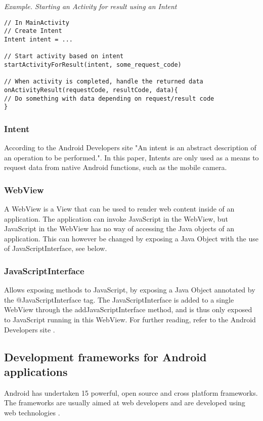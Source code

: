 \emph{Example. Starting an Activity for result using an Intent}
\begin{lstlisting}
// In MainActivity
// Create Intent
Intent intent = ...

// Start activity based on intent
startActivityForResult(intent, some_request_code)

// When activity is completed, handle the returned data
onActivityResult(requestCode, resultCode, data){
// Do something with data depending on request/result code
}
\end{lstlisting}

\subsubsection{Intent}
According to the Android Developers site \cite{intent2015} "An intent is an abstract description of an operation to be performed.". In this paper, Intents are only used as a means to request data from native Android functions, such as the mobile camera.  

\subsubsection{WebView}
A WebView \cite{webview2015} is a View \cite{view2015} that can be used to render web content inside of an application. The application can invoke JavaScript in the WebView, but JavaScript in the WebView has no way of accessing the Java objects of an application. This can however be changed by exposing a Java Object with the use of JavaScriptInterface, see below.

\subsubsection{JavaScriptInterface}
Allows exposing methods to JavaScript, by exposing a Java Object annotated by the @JavaScriptInterface tag. The JavaScriptInterface is added to a single WebView through the addJavaScriptInterface method, and is thus only exposed to JavaScript running in this WebView. For further reading, refer to the Android Developers site \cite{jsi2015}.

\subsection{Development frameworks for Android applications}
Android has undertaken 15 powerful, open source and cross platform frameworks. The frameworks are usually aimed at web developers and are developed using web technologies \cite{mondal2013}.

